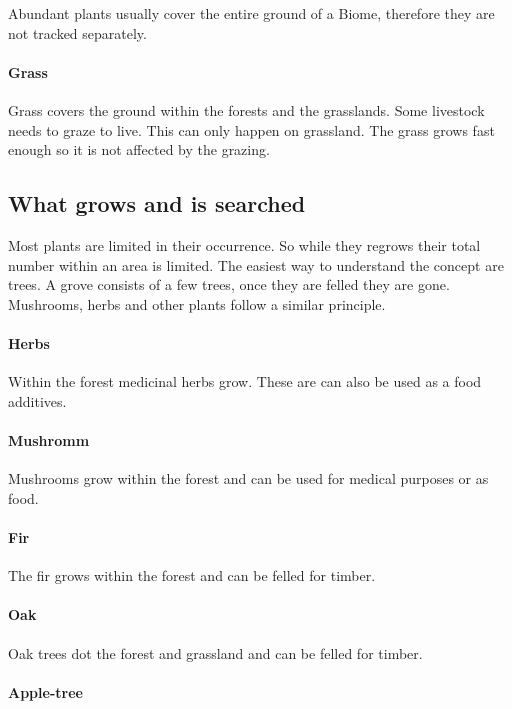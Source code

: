 Abundant plants usually cover the entire ground of a Biome, therefore they are
not tracked separately.

\paragraph{Grass}

Grass covers the ground within the forests and the grasslands. Some livestock
needs to graze to live. This can only happen on grassland. The grass grows fast
enough so it is not affected by the grazing.

\subsection{What grows and is searched}\label{ch:Goods:Nature:Plants:Limited}

Most plants are limited in their occurrence. So while they regrows their total
number within an area is limited. The easiest way to understand the concept are
trees. A grove consists of a few trees, once they are felled they are gone.
Mushrooms, herbs and other plants follow a similar principle.

\paragraph{Herbs}

Within the forest medicinal herbs grow. These are can also be used as a food
additives.

\paragraph{Mushromm}

Mushrooms grow within the forest and can be used for medical purposes or as
food.

\paragraph{Fir}

The fir grows within the forest and can be felled for timber.

\paragraph{Oak}

Oak trees dot the forest and grassland and can be felled for timber.

\paragraph{Apple-tree}

